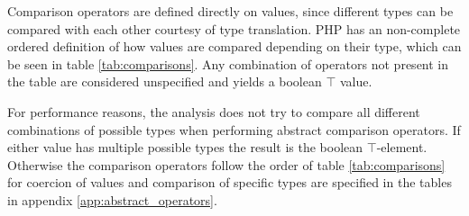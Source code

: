 \begin{table}[htbp]
\centering
{}
\caption{Abstract Modulus}
\label{tab:abstract_modulus1}
\end{table}

Comparison operators are defined directly on values, since different types can be compared with each other courtesy of type translation. PHP has an non-complete ordered definition of how values are compared depending on their type, which can be seen in table \ref{tab:comparisons}. Any combination of operators not present in the table are considered unspecified and yields a boolean $\top$ value. 

For performance reasons, the analysis does not try to compare all different combinations of possible types when performing abstract comparison operators. If either value has multiple possible types the result is the boolean $\top$-element. Otherwise the comparison operators follow the order of table \ref{tab:comparisons} for coercion of values and comparison of specific types are specified in the tables in appendix \ref{app:abstract_operators}.

